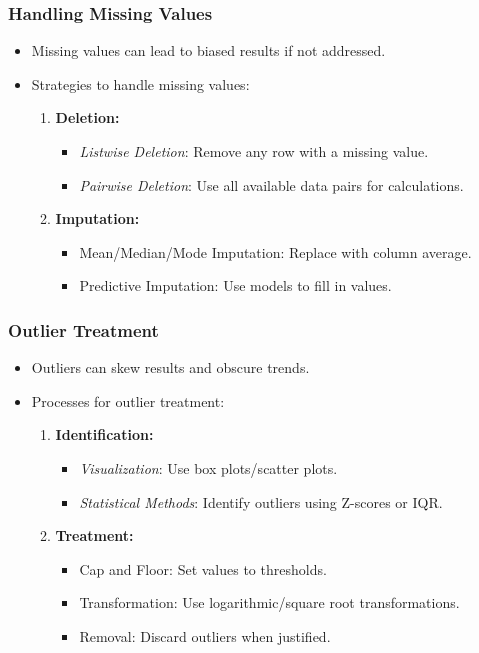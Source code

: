 \documentclass{beamer}
\begin{document}
\begin{frame}
    \frametitle{Handling Missing Values}
    \begin{itemize}
        \item Missing values can lead to biased results if not addressed.
        \item Strategies to handle missing values:
        \begin{enumerate}
            \item \textbf{Deletion:}
            \begin{itemize}
                \item \textit{Listwise Deletion}: Remove any row with a missing value.
                \item \textit{Pairwise Deletion}: Use all available data pairs for calculations.
            \end{itemize}
            \item \textbf{Imputation:}
            \begin{itemize}
                \item Mean/Median/Mode Imputation: Replace with column average.
                \item Predictive Imputation: Use models to fill in values.
            \end{itemize}
        \end{enumerate}
    \end{itemize}
\end{frame}

\begin{frame}
    \frametitle{Outlier Treatment}
    \begin{itemize}
        \item Outliers can skew results and obscure trends.
        \item Processes for outlier treatment:
        \begin{enumerate}
            \item \textbf{Identification:}
            \begin{itemize}
                \item \textit{Visualization}: Use box plots/scatter plots.
                \item \textit{Statistical Methods}: Identify outliers using Z-scores or IQR.
            \end{itemize}
            \item \textbf{Treatment:}
            \begin{itemize}
                \item Cap and Floor: Set values to thresholds.
                \item Transformation: Use logarithmic/square root transformations.
                \item Removal: Discard outliers when justified.
            \end{itemize}
        \end{enumerate}
    \end{itemize}
\end{frame}
\end{document}

